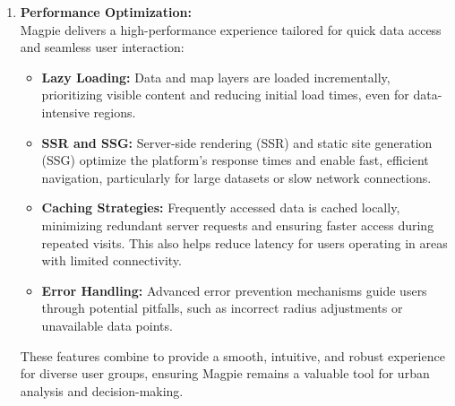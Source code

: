 \begin{enumerate}
\begin{enumerate}
\begin{itemize}
        \end{itemize}
        \item \textbf{Performance Optimization:}\\
        Magpie delivers a high-performance experience tailored for quick data access and seamless user interaction:
        \begin{itemize}
            \item \textbf{Lazy Loading:} Data and map layers are loaded incrementally, prioritizing visible content and reducing initial load times, even for data-intensive regions.
            \item \textbf{SSR and SSG:} Server-side rendering (SSR) and static site generation (SSG) optimize the platform’s response times and enable fast, efficient navigation, particularly for large datasets or slow network connections.
            \item \textbf{Caching Strategies:} Frequently accessed data is cached locally, minimizing redundant server requests and ensuring faster access during repeated visits. This also helps reduce latency for users operating in areas with limited connectivity.
            \item \textbf{Error Handling:} Advanced error prevention mechanisms guide users through potential pitfalls, such as incorrect radius adjustments or unavailable data points.
        \end{itemize}
        These features combine to provide a smooth, intuitive, and robust experience for diverse user groups, ensuring Magpie remains a valuable tool for urban analysis and decision-making.
    \end{enumerate}

\end{enumerate}
